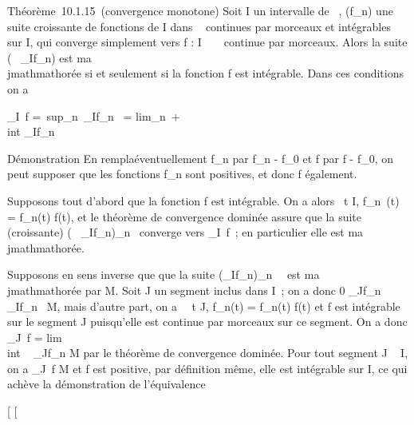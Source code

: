 \documentclass[]{article}
\begin{document}
Théorème~10.1.15~(convergence monotone) Soit I un intervalle de ~,
(f_n) une suite croissante de fonctions de I dans ~ continues
par morceaux et intégrables sur I, qui converge simplement vers f : I \rightarrow~
~ continue par morceaux. Alors la suite (\int ~
_If_n) est ma\\jmathmathorée si et seulement si la fonction f est
intégrable. Dans ces conditions on a

\int  _I~f =\
sup_n\in{}~\int  _If_n~
= lim_n\rightarrow~+\infty~~\\int
 _If_n

Démonstration En rempla\ccant éventuellement
f_n par f_n - f_0 et f par f - f_0,
on peut supposer que les fonctions f_n sont positives, et donc
f également.

Supposons tout d'abord que la fonction f est intégrable. On a alors
\forall~t \in I, f_n~(t) =
f_n(t) \leq f(t), et le théorème de convergence dominée assure que
la suite (croissante) (\int ~
_If_n)_n\in{}~ converge vers
\int  _I~f~; en particulier elle est
ma\\jmathmathorée.

Supposons en sens inverse que que la suite
(\int  _If_n)_n\in{}~~ est
ma\\jmathmathorée par M. Soit J un segment inclus dans I~; on a donc 0
\leq\int  _Jf_n~
\leq\int  _If_n~ \leq M, mais d'autre
part, on a \forall~~t \in J,
f_n(t) = f_n(t) \leq f(t) et f est
intégrable sur le segment J puisqu'elle est continue par morceaux sur ce
segment. On a donc \int  _J~f
= lim\\int ~
_Jf_n \leq M par le théorème de convergence dominée. Pour
tout segment J \subset~ I, on a \int  _J~f \leq M
et f est positive, par définition même, elle est intégrable sur I, ce
qui achève la démonstration de l'équivalence

{[}
{[}
\end{document}
